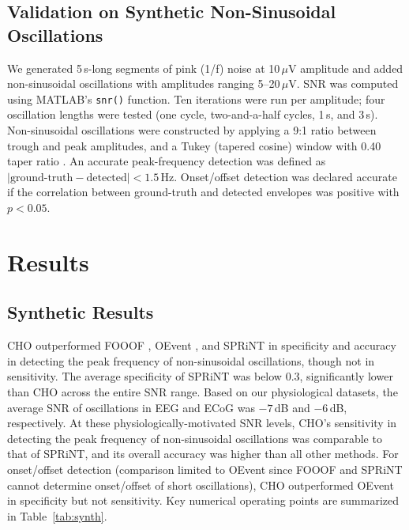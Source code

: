\documentclass[11pt]{article}
\begin{document}
\subsection{Validation on Synthetic Non-Sinusoidal Oscillations}
We generated 5\,s-long segments of pink (1/f) noise at 10\,$\mu$V amplitude and added non-sinusoidal oscillations with amplitudes ranging 5--20\,$\mu$V. SNR was computed using MATLAB's \texttt{snr()} function. Ten iterations were run per amplitude; four oscillation lengths were tested (one cycle, two-and-a-half cycles, 1\,s, and 3\,s). Non-sinusoidal oscillations were constructed by applying a 9:1 ratio between trough and peak amplitudes, and a Tukey (tapered cosine) window with 0.40 taper ratio \citep{bloomfield2004}. An accurate peak-frequency detection was defined as $|\text{ground-truth} - \text{detected}| < 1.5$\,Hz. Onset/offset detection was declared accurate if the correlation between ground-truth and detected envelopes was positive with $p < 0.05$.

\section{Results}
\subsection{Synthetic Results}
CHO outperformed FOOOF \citep{donoghue2020}, OEvent \citep{neymotin2022}, and SPRiNT \citep{wilson2022} in specificity and accuracy in detecting the peak frequency of non-sinusoidal oscillations, though not in sensitivity. The average specificity of SPRiNT was below 0.3, significantly lower than CHO across the entire SNR range. Based on our physiological datasets, the average SNR of oscillations in EEG and ECoG was $-7$\,dB and $-6$\,dB, respectively. At these physiologically-motivated SNR levels, CHO's sensitivity in detecting the peak frequency of non-sinusoidal oscillations was comparable to that of SPRiNT, and its overall accuracy was higher than all other methods. For onset/offset detection (comparison limited to OEvent since FOOOF and SPRiNT cannot determine onset/offset of short oscillations), CHO outperformed OEvent in specificity but not sensitivity. Key numerical operating points are summarized in Table~\ref{tab:synth}.
\end{document}

